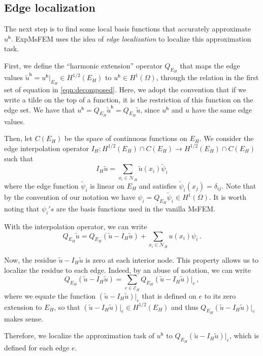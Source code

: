 \documentclass[12pt]{caltech_thesis}
\numberwithin{equation}{section}
\begin{document}
\subsection{Edge localization} 
\label{sec: edge loc}
The next step is to find some local basis functions that accurately approximate $u^\mathsf{h}$. ExpMsFEM uses the idea of \textit{edge localization} to localize this approximation task.

First, we define the ``harmonic extension'' operator $Q_{E_H}$ that maps the edge values $\tilde{u}^\mathsf{h} = u^\mathsf{h}|_{E_H} \in H^{1/2}(E_H)$ to $ u^\mathsf{h} \in H^1(\Omega)$, through the relation in the first set of equation in \eqref{eqn:decomposed}. Here, we adopt the convention that if we write a tilde on the top of a function, it is the restriction of this function on the edge set. We have that $u^\mathsf{h} = Q_{E_H}\tilde{u}^\mathsf{h} = Q_{E_H}\tilde{u}$, since $u^\mathsf{h}$ and $u$ have the same edge values.

Then, let $C(E_H)$ be the space of continuous functions on $E_H$. We consider the edge interpolation operator $I_H: H^{1/2}(E_H) \cap C(E_H) \to H^{1/2}(E_H) \cap C(E_H)$ such that \[I_H \tilde{u} = \sum_{x_i \in \mathcal{N}_H} \tilde{u}(x_i)\tilde{\psi}_i\] where the edge function $\tilde{\psi}_i$ is linear on $E_H$ and satisfies $\tilde{\psi}_i(x_j) = \delta_{ij}$. Note that by the convention of our notation we have $\psi_i = Q_{E_H}\tilde{\psi}_i \in H^1(\Omega)$. It is worth noting that $\psi_i's$ are the basis functions used in the vanilla MsFEM.

With the interpolation operator, we can write 
\[Q_{E_H}\tilde{u} = Q_{E_H}(\tilde{u}-I_H\tilde{u}) + \sum_{x_i \in \mathcal{N}_H} u(x_i) \psi_i\, . \]

Now, the residue $\tilde{u}-I_H\tilde{u}$ is zero at each interior node. This property allows us to localize the residue to each edge. Indeed, by an abuse of notation, we can write
\begin{equation}
    Q_{E_H}(\tilde{u}-I_H\tilde{u}) = \sum_{e \in \mathcal{E}_H} Q_{E_H}(\tilde{u}-I_H\tilde{u})|_{e}\, ,
\end{equation}
where we equate the function $(\tilde{u}-I_H\tilde{u})|_{e}$ that is defined on $e$ to its zero extension to $E_H$, so that $(\tilde{u}-I_H\tilde{u})|_{e}\in H^{1/2}(E_H)$ and thus $Q_{E_H}(\tilde{u}-I_H\tilde{u})|_{e}$ makes sense.

Therefore, we localize the approximation task of $u^\mathsf{h}$ to $Q_{E_H}(\tilde{u}-I_H\tilde{u})|_{e}$, which is defined for each edge $e$.
\end{document}
